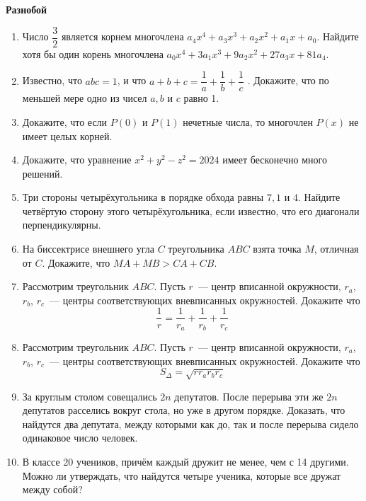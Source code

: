 \documentclass{article}
\begin{document}
\large
	
\begin{center}
	\textbf{Разнобой}
\end{center}


\begin{enumerate}[label*=\protect\fbox{\arabic{enumi}}]
	
\item Число $\dfrac{3}{2}$ является корнем многочлена $a_4x^4 + a_3x^3 + a_2x^2 + a_1x + a_0$. Найдите хотя
бы один корень многочлена $a_0x^4 + 3a_1x^3 + 9a_2x^2 + 27a_3x + 81a_4$.

\item Известно, что $abc = 1$, и что
$a + b + c = \dfrac{1}{a} + \dfrac{1}{b} + \dfrac{1}{c}$ . Докажите, что по меньшей мере одно из чисел $a, b$ и $c$ равно 1.

\item Докажите, что если $P(0)$ и $P(1)$ нечетные числа, то многочлен $P(x)$ не имеет целых корней.

\item Докажите, что уравнение $x^2 + y^2 - z^2 = 2024$ имеет бесконечно много решений.

\item Три стороны четырёхугольника в порядке обхода равны $7, 1$ и $4$. Найдите четвёртую сторону этого четырёхугольника, если известно, что его диагонали перпендикулярны.

\item На биссектрисе внешнего угла $C$ треугольника $ABC$ взята точка $M$, отличная от $C$. Докажите, что $MA+ MB > CA + CB$.

\item Рассмотрим треугольник $ABC$. Пусть $r$~--- центр вписанной окружности, $r_a$,$r_b$, $r_c$~--- центры соответствующих вневписанных окружностей. Докажите что $$\frac{1}{r} = \frac{1}{r_a}  + \frac{1}{r_b} + \frac{1}{r_c} $$

\item Рассмотрим треугольник $ABC$. Пусть $r$~--- центр вписанной окружности, $r_a$,$r_b$, $r_c$~--- центры соответствующих вневписанных окружностей. Докажите что $$S_\Delta = \sqrt{rr_ar_br_c} $$

\item За круглым столом совещались $2n$ депутатов. После перерыва эти же $2n$ депутатов расселись вокруг стола, но уже в другом порядке.
Доказать, что найдутся два депутата, между которыми как до, так и после перерыва сидело одинаковое число человек.

\item В классе 20 учеников, причём каждый дружит не менее, чем с 14 другими.
Можно ли утверждать, что найдутся четыре ученика, которые все дружат
между собой?


\end{enumerate}
\end{document}
